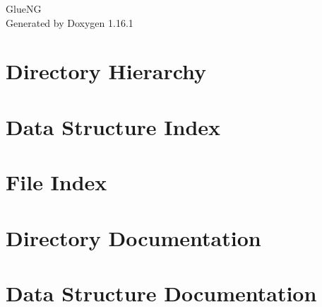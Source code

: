 \documentclass[twoside]{book}
\newcommand{\+}{\discretionary{\mbox{\scriptsize$\hookleftarrow$}}{}{}}
\newcommand{\clearemptydoublepage}{%
    \newpage{\pagestyle{empty}\cleardoublepage}%
  }
\begin{document}
  \raggedbottom
    \hypersetup{pageanchor=false,
                bookmarksnumbered=true,
                pdfencoding=unicode
               }
  \begin{titlepage}
  \vspace*{7cm}
  \begin{center}%
  {\Large Glue\+NG}\\
  \vspace*{1cm}
  {\large Generated by Doxygen 1.16.1}\\
  \end{center}
  \end{titlepage}
  \clearemptydoublepage
  \tableofcontents
  \clearemptydoublepage
  \hypersetup{pageanchor=true}

\chapter{Directory Hierarchy}

\chapter{Data Structure Index}

\chapter{File Index}

\chapter{Directory Documentation}


\chapter{Data Structure Documentation}







\end{document}
